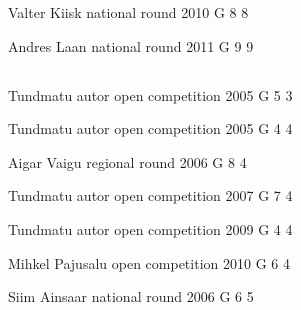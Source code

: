 \documentclass[11pt]{article}
\begin{document}
\ylDisplay{} %
{Valter Kiisk} %
{national round} %
{2010} %
{G 8} %
{8} %
{

\ifEngStatement
\fi
}

\ylDisplay{} %
{Andres Laan} %
{national round} %
{2011} %
{G 9} %
{9} %
{

\ifEngStatement
\fi
}
\newpage\subsection{\protect{}}

\ylDisplay{} %
{Tundmatu autor} %
{open competition} %
{2005} %
{G 5} %
{3} %
{

\ifEngStatement
\fi
}

\ylDisplay{} %
{Tundmatu autor} %
{open competition} %
{2005} %
{G 4} %
{4} %
{

\ifEngStatement
\fi
}

\ylDisplay{} %
{Aigar Vaigu} %
{regional round} %
{2006} %
{G 8} %
{4} %
{

\ifEngStatement
\fi
}

\ylDisplay{} %
{Tundmatu autor} %
{open competition} %
{2007} %
{G 7} %
{4} %
{

\ifEngStatement
\fi
}

\ylDisplay{} %
{Tundmatu autor} %
{open competition} %
{2009} %
{G 4} %
{4} %
{

\ifEngStatement
\fi
}

\ylDisplay{} %
{Mihkel Pajusalu} %
{open competition} %
{2010} %
{G 6} %
{4} %
{

\ifEngStatement
\fi
}

\ylDisplay{} %
{Siim Ainsaar} %
{national round} %
{2006} %
{G 6} %
{5} %
{

\ifEngStatement
\fi
}
\end{document}
